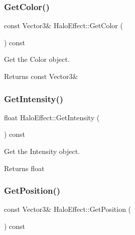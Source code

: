 \subsubsection{\texorpdfstring{Get\+Color()}{GetColor()}}
{\footnotesize\ttfamily const Vector3\& Halo\+Effect\+::\+Get\+Color (\begin{DoxyParamCaption}{ }\end{DoxyParamCaption}) const\hspace{0.3cm}{\ttfamily [inline]}}



Get the Color object. 

\begin{DoxyReturn}{Returns}
const Vector3\& 
\end{DoxyReturn}
\mbox{\label{classHaloEffect_a84a3c6b6053f6f4e5215db8113e752c5}} 
\subsubsection{\texorpdfstring{Get\+Intensity()}{GetIntensity()}}
{\footnotesize\ttfamily float Halo\+Effect\+::\+Get\+Intensity (\begin{DoxyParamCaption}{ }\end{DoxyParamCaption}) const\hspace{0.3cm}{\ttfamily [inline]}}



Get the Intensity object. 

\begin{DoxyReturn}{Returns}
float 
\end{DoxyReturn}
\mbox{\label{classHaloEffect_a775ccc873130c615bd4c1fbd0abf7e11}} 
\subsubsection{\texorpdfstring{Get\+Position()}{GetPosition()}}
{\footnotesize\ttfamily const Vector3\& Halo\+Effect\+::\+Get\+Position (\begin{DoxyParamCaption}{ }\end{DoxyParamCaption}) const\hspace{0.3cm}{\ttfamily [inline]}}



